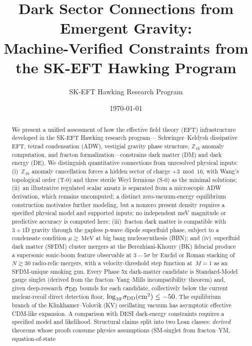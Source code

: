 \documentclass[aps,prd,twocolumn,showpacs,superscriptaddress,nofootinbib]{revtex4-2}
\begin{document}
\title{Dark Sector Connections from Emergent Gravity:\\
Machine-Verified Constraints from the SK-EFT Hawking Program}

\author{SK-EFT Hawking Research Program}

\date{\today}

\begin{abstract}
We present a unified assessment of how the effective field theory (EFT)
infrastructure developed in the SK-EFT Hawking research program—%
Schwinger--Keldysh dissipative EFT, tetrad condensation (ADW), vestigial
gravity phase structure, $\mathbb{Z}_{16}$ anomaly computation, and
fracton formalization—constrains dark matter (DM) and dark energy (DE).
We distinguish quantitative connections from unresolved physical inputs: (i)~$\mathbb{Z}_{16}$
anomaly cancellation forces a hidden sector of charge $+3 \bmod 16$, with
Wang's topological order (T-0) and three sterile Weyl fermions (S-0) as
the minimal solutions; (ii)~an illustrative regulated scalar ansatz is
separated from a microscopic ADW derivation, which remains uncomputed;
a distinct zero-vacuum-energy equilibrium construction motivates further
modeling, but a nonzero present density
requires a specified physical model and supported inputs; no independent
meV magnitude or predictive accuracy is computed here; (iii)~fracton dark
matter is compatible with $3{+}1$D gravity through the gapless p-wave
dipole superfluid phase, subject to a condensate condition $\mu \gtrsim
\SI{}{\mega\electronvolt}$ at big bang nucleosynthesis (BBN); and
(iv)~superfluid dark matter (SFDM) cluster mergers at the Berezhiani-Khoury
(BK) fiducial produce a supersonic sonic-boom feature observable at
$3{-}5\sigma$ by Euclid or Roman stacking of~$N \gtrsim 30$ radio-relic
mergers, with a velocity-threshold step function at~$M{=}1$ as an SFDM-unique
smoking gun. Every Phase 5x dark-matter candidate is Standard-Model gauge singlet
(derived from the fracton--Yang--Mills incompatibility theorem) and,
given deep-research $\sigma_{\rm DD}$ bounds for each candidate,
collectively below the current nuclear-recoil direct detection floor,
$\log_{10}\sigma_{\rm DD}(\SI{}{\centi\meter\squared}) \leq -50$.
The equilibrium branch of the Klinkhamer--Volovik (KV) oscillating
vacuum has asymptotic effective CDM-like expansion. A comparison
with DESI dark-energy constraints requires a specified model and likelihood. Structural claims split
into two Lean classes: \emph{derived} theorems whose proofs consume
physics assumptions (SM-singlet from fracton--YM, equation-of-state

\end{abstract}
\end{document}
